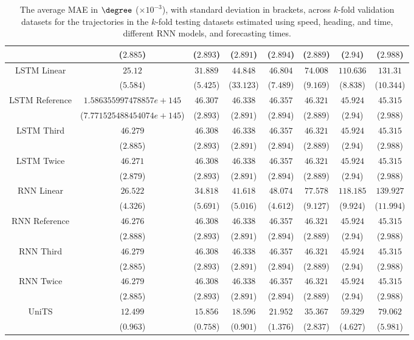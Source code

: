 \begin{table}[!ht]
{\begin{tabular}{|c|c|c|c|c|c|c|c|}
			 & ($2.885$) & ($2.893$) & ($2.891$) & ($2.894$) & ($2.889$) & ($2.94$) & ($2.988$) \\ \hline
			\multirow{2}{*}{LSTM Linear} & $25.12$ & $31.889$ & $44.848$ & $46.804$ & $74.008$ & $110.636$ & $131.31$ \\
			 & ($5.584$) & ($5.425$) & ($33.123$) & ($7.489$) & ($9.169$) & ($8.838$) & ($10.344$) \\ \hline
			\multirow{2}{*}{LSTM Reference} & $1.586355997478857e+145$ & $46.307$ & $46.338$ & $46.357$ & $46.321$ & $45.924$ & $45.315$ \\
			 & ($7.771525488454074e+145$) & ($2.893$) & ($2.891$) & ($2.894$) & ($2.889$) & ($2.94$) & ($2.988$) \\ \hline
			\multirow{2}{*}{LSTM Third} & $46.279$ & $46.308$ & $46.338$ & $46.357$ & $46.321$ & $45.924$ & $45.315$ \\
			 & ($2.885$) & ($2.893$) & ($2.891$) & ($2.894$) & ($2.889$) & ($2.94$) & ($2.988$) \\ \hline
			\multirow{2}{*}{LSTM Twice} & $46.271$ & $46.308$ & $46.338$ & $46.357$ & $46.321$ & $45.924$ & $45.315$ \\
			 & ($2.879$) & ($2.893$) & ($2.891$) & ($2.894$) & ($2.889$) & ($2.94$) & ($2.988$) \\ \hline
			\multirow{2}{*}{RNN Linear} & $26.522$ & $34.818$ & $41.618$ & $48.074$ & $77.578$ & $118.185$ & $139.927$ \\
			 & ($4.326$) & ($5.691$) & ($5.016$) & ($4.612$) & ($9.127$) & ($9.924$) & ($11.994$) \\ \hline
			\multirow{2}{*}{RNN Reference} & $46.276$ & $46.308$ & $46.338$ & $46.357$ & $46.321$ & $45.924$ & $45.315$ \\
			 & ($2.888$) & ($2.893$) & ($2.891$) & ($2.894$) & ($2.889$) & ($2.94$) & ($2.988$) \\ \hline
			\multirow{2}{*}{RNN Third} & $46.279$ & $46.308$ & $46.338$ & $46.357$ & $46.321$ & $45.924$ & $45.315$ \\
			 & ($2.885$) & ($2.893$) & ($2.891$) & ($2.894$) & ($2.889$) & ($2.94$) & ($2.988$) \\ \hline
			\multirow{2}{*}{RNN Twice} & $46.279$ & $46.308$ & $46.338$ & $46.357$ & $46.321$ & $45.924$ & $45.315$ \\
			 & ($2.885$) & ($2.893$) & ($2.891$) & ($2.894$) & ($2.889$) & ($2.94$) & ($2.988$) \\ \hline
			\multirow{2}{*}{UniTS} & $12.499$ & $15.856$ & $18.596$ & $21.952$ & $35.367$ & $59.329$ & $79.062$ \\
			 & ($0.963$) & ($0.758$) & ($0.901$) & ($1.376$) & ($2.837$) & ($4.627$) & ($5.981$) \\ \hline
		\end{tabular}
	}
	\caption{The average MAE in $\degree$ ($\times 10^{-3}$), with standard deviation in brackets, across $k$-fold validation datasets for the trajectories in the $k$-fold testing datasets estimated using speed, heading, and time, different RNN models, and forecasting times.}
	\label{tab:all_speed_actual_dir_MAE}
\end{table}

